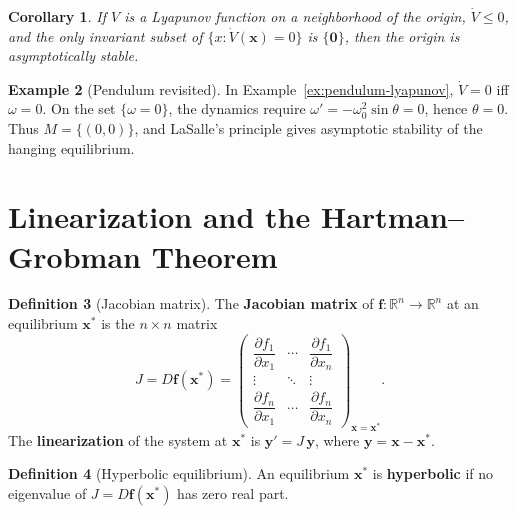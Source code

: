 \documentclass[12pt,a4paper,openany]{book}
\theoremstyle{definition}
\newtheorem{definition}{Definition}[chapter]
\newtheorem{example}[definition]{Example}
\theoremstyle{plain}
\newtheorem{corollary}[definition]{Corollary}
\theoremstyle{remark}
\newcommand{\R}{\mathbb{R}}
\begin{document}
\begin{corollary}
\label{cor:lasalle-asymptotic}
If \(V\) is a Lyapunov function on a neighborhood of the origin,
\(\dot{V}\le 0\), and the only invariant subset of
\(\{x:\dot{V}(\mathbf{x})=0\}\) is \(\{\mathbf{0}\}\), then the origin is
asymptotically stable.
\end{corollary}

\begin{example}[Pendulum revisited]
\label{ex:pendulum-lasalle}
In Example~\ref{ex:pendulum-lyapunov}, \(\dot{V}=0\) iff \(\omega=0\). On the
set \(\{\omega=0\}\), the dynamics require \(\omega'=-\omega_0^2\sin\theta=0\),
hence \(\theta=0\). Thus \(M=\{(0,0)\}\), and LaSalle's principle gives
asymptotic stability of the hanging equilibrium.
\end{example}


\section{Linearization and the Hartman--Grobman Theorem}
\label{sec:linearization}

\begin{definition}[Jacobian matrix]
\label{def:jacobian}
The \textbf{Jacobian matrix} of
\(\mathbf{f}\colon\R^n\to\R^n\) at an equilibrium \(\mathbf{x}^*\) is the
\(n\times n\) matrix
\[
  J = D\mathbf{f}(\mathbf{x}^*) =
  \begin{pmatrix}
    \dfrac{\partial f_1}{\partial x_1} & \cdots & \dfrac{\partial f_1}{\partial x_n} \\[6pt]
    \vdots & \ddots & \vdots \\[3pt]
    \dfrac{\partial f_n}{\partial x_1} & \cdots & \dfrac{\partial f_n}{\partial x_n}
  \end{pmatrix}_{\mathbf{x}=\mathbf{x}^*}.
\]
The \textbf{linearization} of the system at
\(\mathbf{x}^*\) is \(\mathbf{y}'=J\,\mathbf{y}\), where
\(\mathbf{y}=\mathbf{x}-\mathbf{x}^*\).
\end{definition}

\begin{definition}[Hyperbolic equilibrium]
\label{def:hyperbolic}
An equilibrium \(\mathbf{x}^*\) is \textbf{hyperbolic} if no eigenvalue of
\(J=D\mathbf{f}(\mathbf{x}^*)\) has zero real part.
\end{definition}
\end{document}
